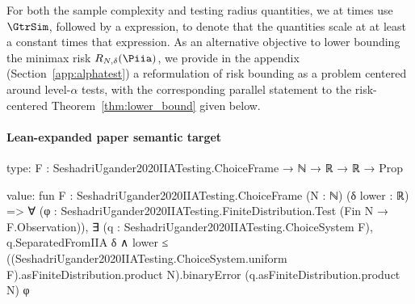 \documentclass[10pt]{article}
\begin{document}
\begin{ReviewVerbatim}
	For both the sample complexity and testing radius quantities, we at times use $\GtrSim$, followed by a expression, to denote that the quantities scale at at least a constant times that expression. As an alternative objective to lower bounding the minimax risk $R_{N,\delta}(\Piia)$, we provide in the appendix (Section~\ref{app:alphatest}) a reformulation of risk bounding as a problem centered around level-$\alpha$ tests, with the corresponding parallel statement to the risk-centered Theorem~\ref{thm:lower_bound} given below.
\end{ReviewVerbatim}



\paragraph{Lean-expanded paper semantic target}
\begin{ReviewVerbatim}
type:
{F : SeshadriUgander2020IIATesting.ChoiceFrame} → ℕ → ℝ → ℝ → Prop

value:
fun {F : SeshadriUgander2020IIATesting.ChoiceFrame} (N : ℕ) (δ lower : ℝ) =>
  ∀ (φ : SeshadriUgander2020IIATesting.FiniteDistribution.Test (Fin N → F.Observation)),
    ∃ (q : SeshadriUgander2020IIATesting.ChoiceSystem F),
      q.SeparatedFromIIA δ ∧
        lower ≤
          ((SeshadriUgander2020IIATesting.ChoiceSystem.uniform F).asFiniteDistribution.product N).binaryError
            (q.asFiniteDistribution.product N) φ
\end{ReviewVerbatim}
\end{document}
